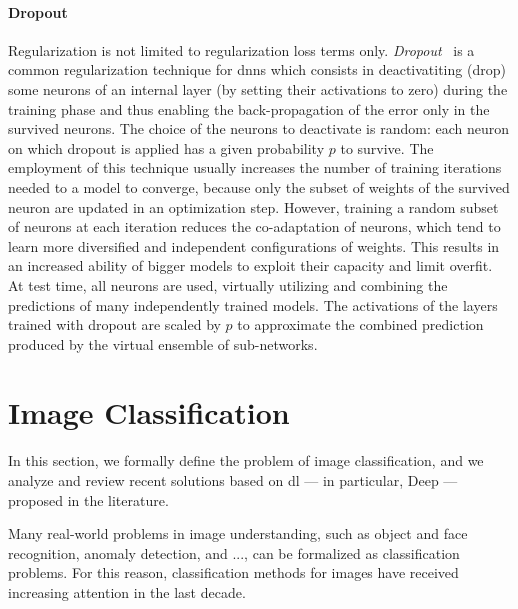 \paragraph{Dropout}
Regularization is not limited to regularization loss terms only.
\emph{Dropout}~\cite{hinton2012improving} is a common regularization technique for \glspl{dnn} which consists in deactivatiting (drop) some neurons of an internal layer (by setting their activations to zero) during the training phase and thus enabling the back-propagation of the error only in the survived neurons.
The choice of the neurons to deactivate is random: each neuron on which dropout is applied has a given probability $p$ to survive.
The employment of this technique usually increases the number of training iterations needed to a model to converge, because only the subset of weights of the survived neuron are updated in an optimization step.
However, training a random subset of neurons at each iteration reduces the co-adaptation of neurons, which tend to learn more diversified and independent configurations of weights.
This results in an increased ability of bigger models to exploit their capacity and limit overfit.
At test time, all neurons are used, virtually utilizing and combining the predictions of many independently trained models.
The activations of the layers trained with dropout are scaled by $p$ to approximate the combined prediction produced by the virtual ensemble of sub-networks.


\section{Image Classification}
\label{sec:back:image-classification}

In this section, we formally define the problem of image classification, and we analyze and review recent solutions based on \acrlong{dl} --- in particular, Deep  --- proposed in the literature.

Many real-world problems in image understanding, such as object and face recognition, anomaly detection, and ..., can be formalized as classification problems.
For this reason, classification methods for images have received increasing attention in the last decade.

